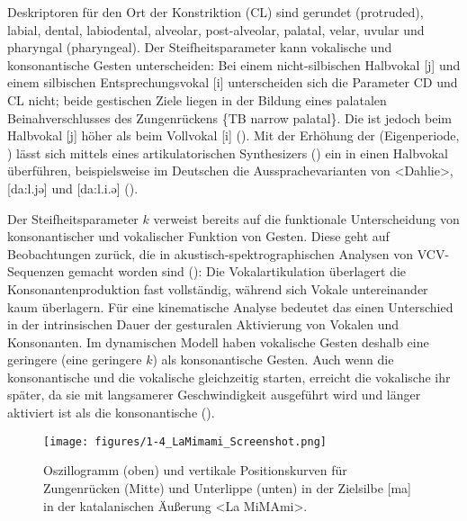 Deskriptoren für den Ort der Konstriktion (CL) sind gerundet (protruded), labial, dental, labiodental, alveolar, post-alveolar, palatal, velar, uvular und pharyngal (pharyngeal). Der Steifheitsparameter  kann vokalische und konsonantische Gesten unterscheiden: Bei einem nicht-silbischen Halbvokal [j] und einem silbischen Entsprechungsvokal [i] unterscheiden sich die Parameter CD und CL nicht; beide gestischen Ziele liegen in der Bildung eines palatalen Beinahverschlusses des Zungenrückens \{TB narrow palatal\}. Die  ist jedoch beim Halbvokal [j] höher als beim Vollvokal [i] (\citealt{Browman1989}). Mit der Erhöhung der  (Eigenperiode, ) lässt sich mittels eines artikulatorischen Synthesizers (\citealt{Kröger1993}) ein  in einen Halbvokal überführen, beispielsweise im Deutschen die Aussprachevarianten von <Dahlie>, [da:l.jə] und [da:l.i.ə] (\citealt[vgl.][]{Mücke1999}). 

  
Der Steifheitsparameter $k$ verweist bereits auf die funktionale Unterscheidung von konsonantischer und vokalischer Funktion von Gesten. Diese geht auf Beobachtungen zurück, die in akustisch-spektrographischen Analysen von VCV-Sequenzen gemacht worden sind (\citealt{Öhman1966}): Die Vokalartikulation überlagert die Konsonantenproduktion fast vollständig, während sich Vokale untereinander kaum überlagern. Für eine kinematische Analyse bedeutet das einen Unterschied in der intrinsischen Dauer der gesturalen Aktivierung von Vokalen und Konsonanten. Im dynamischen Modell haben vokalische Gesten deshalb eine geringere  (eine geringere  $k$) als konsonantische Gesten. Auch wenn die konsonantische und die vokalische  gleichzeitig starten, erreicht die vokalische  ihr  später, da sie mit langsamerer Geschwindigkeit ausgeführt wird und länger aktiviert ist als die konsonantische  (\citealt{Goldstein2006}). 

  
\begin{figure} 
	\texttt{[image: figures/1-4\_LaMimami\_Screenshot.png]}
	\caption{Oszillogramm (oben) und vertikale Positionskurven für Zungenrücken (Mitte) und Unterlippe (unten) in der Zielsilbe [ma] in der katalanischen Äußerung <La MiMAmi>.}
	\label{figure:0104}
\end{figure}

